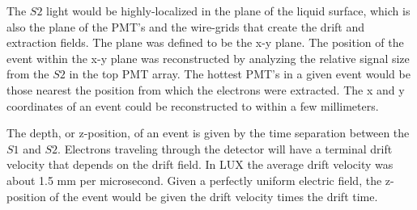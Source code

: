 The $S2$ light would be highly-localized in the plane of the liquid surface, which is also the plane of the PMT's and the wire-grids that create the drift and extraction fields. The plane was defined to be the x-y plane. The position of the event within the x-y plane was reconstructed by analyzing the relative signal size from the $S2$ in the top PMT array. The hottest PMT's in a given event would be those nearest the position from which the electrons were extracted. The x and y coordinates of an event could be reconstructed to within a few millimeters.

The depth, or z-position, of an event is given by the time separation between the $S1$ and $S2$. Electrons traveling through the detector will have a terminal drift velocity that depends on the drift field. In LUX the average drift velocity was about 1.5 mm per microsecond. Given a perfectly uniform electric field, the z-position of the event would be given the drift velocity times the drift time.


